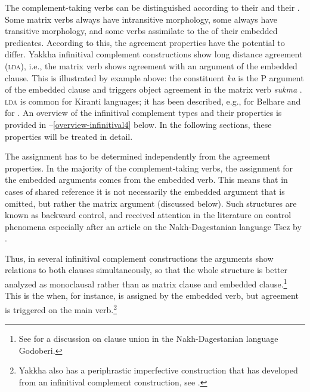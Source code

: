  The complement-taking verbs can be distinguished according to their  and their . Some matrix verbs always have intransitive morphology, some always have transitive morphology, and some verbs assimilate to the  of their embedded predicates.   According  to this, the agreement properties have the potential to differ. Yakkha infinitival complement constructions show long distance agreement (\textsc{lda}), i.e., the matrix verb shows agreement with an argument of the embedded clause. This is illustrated  by example \LLast[b] above: the constituent \emph{ka}  is the P argument of the embedded clause and triggers object agreement in the matrix verb \emph{sukma} . \textsc{lda} is common for Kiranti languages; it has been described,  e.g., for Belhare \citep{Bickeletal2001Syntactic, Bickel2004Hidden} and for  \citep{Schackow2008Clause}. An overview of the infinitival complement types and their properties is provided in --\ref{overview-infinitival4} below. In the following sections, these properties will be treated in detail.
 
The  assignment has to be determined independently from the agreement properties. In the majority of the complement-taking verbs, the  assignment for the embedded arguments comes from the embedded verb. This means that in cases of shared reference it is not necessarily the embedded argument that is omitted, but rather the matrix argument (discussed below). Such structures are known as backward control, and received attention in the literature on control phenomena especially after an article on the Nakh-Dagestanian language Tsez by \citet{Polinskyetal2002_Backward}. 

Thus, in several infinitival complement constructions the arguments show relations to both clauses simultaneously, so that the whole structure is better analyzed as monoclausal rather than as matrix clause and embedded clause.\footnote{See \citet{Haspelmath1999Long-distance} for a discussion on clause union in the Nakh-Dagestanian language Godoberi.}  This is the  when, for instance,   is assigned by the embedded verb, but agreement is triggered on the  main verb.\footnote{Yakkha also has a periphrastic imperfective construction that  has developed from an infinitival complement construction, see .}  




